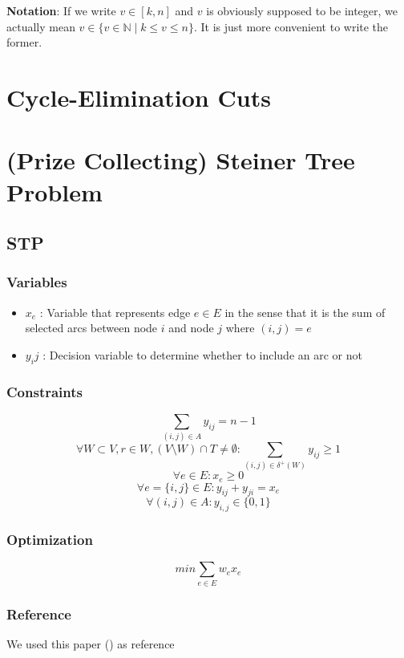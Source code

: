 \documentclass{article}
\begin{document}
\sloppy


\textbf{Notation}: If we write $ v \in [k,n] $ and $v$ is obviously supposed to be integer, we actually mean $v \in \{v \in \mathbb{N} \mid k \leq v \leq n\}$. It is just more convenient to write the former.

\section{Cycle-Elimination Cuts}

\clearpage

\section{(Prize Collecting) Steiner Tree Problem}

\subsection{STP}

\subsubsection{Variables}
\begin{itemize}
	\item $x_e$ : Variable that represents edge $e \in E$ in the sense that it is the sum of selected arcs between node $i$ and node $j$ where $(i,j) = e$ 
	\item $y_ij$ : Decision variable to determine whether to include an arc or not
\end{itemize}

\subsubsection{Constraints}
\[ \sum_{(i,j)\in A}y_{ij} = n-1 \]
\[ \forall W \subset V, r \in W, (V \setminus W) \cap T \neq \emptyset : \sum_{(i,j)\in \delta^+(W)}y_{ij} \geq 1 \]
\[ \forall e \in E : x_e \geq 0 \]
\[ \forall e = \{i,j\} \in E : y_{ij} + y_{ji} = x_e \]
\[ \forall (i,j) \in A : y_{i,j} \in \{0,1\} \]

\subsubsection{Optimization}
\[ min \sum_{e\in E}w_ex_e \]

\subsubsection{Reference}
We used this paper (\cite{solving_steiner_tree_problems}) as reference
\end{document}
